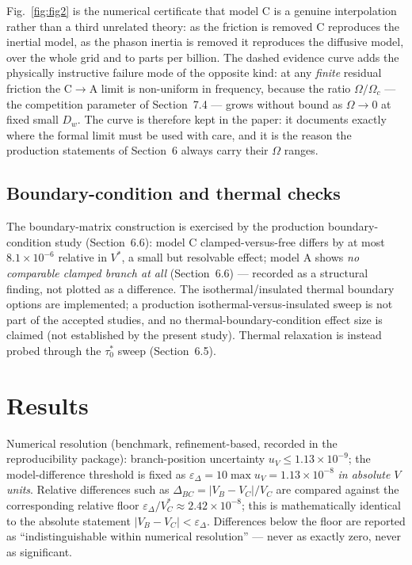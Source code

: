 \documentclass[11pt]{article}
\newcommand{\e}{\varepsilon}
\newcommand{\Om}{\Omega}
\newcommand{\Dw}{D_w}
\begin{document}
Fig.~\ref{fig:fig2} is the numerical certificate that model C is a genuine interpolation rather than a third unrelated theory: as the friction is removed C reproduces the inertial model, as the phason inertia is removed it reproduces the diffusive model, over the whole grid and to parts per billion. The dashed evidence curve adds the physically instructive failure mode of the opposite kind: at any \emph{finite} residual friction the C$\to$A limit is non-uniform in frequency, because the ratio $\Om/\Om_c$ --- the competition parameter of Section~7.4 --- grows without bound as $\Om\to0$ at fixed small $\Dw$. The curve is therefore kept in the paper: it documents exactly where the formal limit must be used with care, and it is the reason the production statements of Section~6 always carry their $\Om$ ranges.

\subsection{Boundary-condition and thermal checks}

The boundary-matrix construction is exercised by the production boundary-condition study (Section~6.6): model C clamped-versus-free differs by at most $8.1\times10^{-6}$ relative in $V^*$, a small but resolvable effect; model A shows \emph{no comparable clamped branch at all} (Section~6.6) --- recorded as a structural finding, not plotted as a difference. The isothermal/insulated thermal boundary options are implemented; a production isothermal-versus-insulated sweep is not part of the accepted studies, and no thermal-boundary-condition effect size is claimed (not established by the present study). Thermal relaxation is instead probed through the $\tau_0^*$ sweep (Section~6.5).

\section{Results}

Numerical resolution (benchmark, refinement-based, recorded in the reproducibility package): branch-position uncertainty $u_V\le1.13\times10^{-9}$; the model-difference threshold is fixed as $\e_\Delta=10\max u_V=1.13\times10^{-8}$ \emph{in absolute $V$ units}. Relative differences such as $\Delta_{BC}=|V_B-V_C|/V_C$ are compared against the corresponding relative floor $\e_\Delta/V_C^*\approx2.42\times10^{-8}$; this is mathematically identical to the absolute statement $|V_B-V_C|<\e_\Delta$. Differences below the floor are reported as ``indistinguishable within numerical resolution'' --- never as exactly zero, never as significant.
\end{document}
